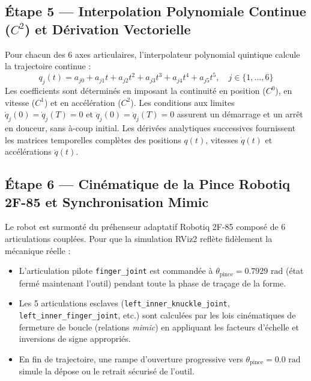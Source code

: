 \documentclass[11pt,a4paper]{report}
\begin{document}
\subsection{Étape 5 — Interpolation Polynomiale Continue ($C^2$) et Dérivation Vectorielle}
Pour chacun des 6 axes articulaires, l'interpolateur polynomial quintique calcule la trajectoire continue :
\begin{equation}
    q_j(t) = a_{j0} + a_{j1}t + a_{j2}t^2 + a_{j3}t^3 + a_{j4}t^4 + a_{j5}t^5, \quad j \in \{1, \dots, 6\}
\end{equation}
Les coefficients sont déterminés en imposant la continuité en position ($C^0$), en vitesse ($C^1$) et en accélération ($C^2$). Les conditions aux limites $\dot{q}_j(0) = \dot{q}_j(T) = 0$ et $\ddot{q}_j(0) = \ddot{q}_j(T) = 0$ assurent un démarrage et un arrêt en douceur, sans à-coup initial. Les dérivées analytiques successives fournissent les matrices temporelles complètes des positions $q(t)$, vitesses $\dot{q}(t)$ et accélérations $\ddot{q}(t)$.

\subsection{Étape 6 — Cinématique de la Pince Robotiq 2F-85 et Synchronisation Mimic}
Le robot est surmonté du préhenseur adaptatif Robotiq 2F-85 composé de 6 articulations couplées. Pour que la simulation RViz2 reflète fidèlement la mécanique réelle :
\begin{itemize}
    \item L'articulation pilote \texttt{finger\_joint} est commandée à $\theta_{\text{pince}} = 0.7929\text{ rad}$ (état fermé maintenant l'outil) pendant toute la phase de traçage de la forme.
    \item Les 5 articulations esclaves (\texttt{left\_inner\_knuckle\_joint}, \texttt{left\_inner\_finger\_joint}, etc.) sont calculées par les lois cinématiques de fermeture de boucle (relations \textit{mimic}) en appliquant les facteurs d'échelle et inversions de signe appropriés.
    \item En fin de trajectoire, une rampe d'ouverture progressive vers $\theta_{\text{pince}} = 0.0\text{ rad}$ simule la dépose ou le retrait sécurisé de l'outil.
\end{itemize}
\end{document}
